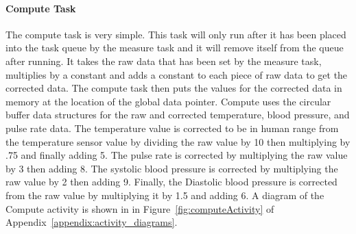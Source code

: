 \documentclass[12pt]{article} %
\begin{document}
    \paragraph{Compute Task} The compute task is very simple. This task will
    only run after it has been placed into the task queue by the measure task
    and it will remove itself from the queue after running. It takes the raw
    data that has been set by the measure task, multiplies by a constant and
    adds a constant to each piece of raw data to get the corrected data. The
    compute task then puts the values for the corrected data in memory at the
    location of the global data pointer. Compute uses the circular buffer data structures for the raw and corrected  temperature, blood pressure, and pulse rate data.
The temperature value is corrected to be in human range from the temperature sensor value by dividing the raw value by 10 then multiplying by .75 and finally adding 5.
The pulse rate is corrected by multiplying the raw value by 3 then adding 8.
The systolic blood pressure is corrected by multiplying the raw value by 2 then adding 9. Finally, the Diastolic blood pressure is corrected from the raw value by multiplying it by 1.5 and adding 6.
A diagram of the Compute activity is shown in
in Figure~\ref{fig:computeActivity} of Appendix~\ref{appendix:activity_diagrams}.
\end{document}

